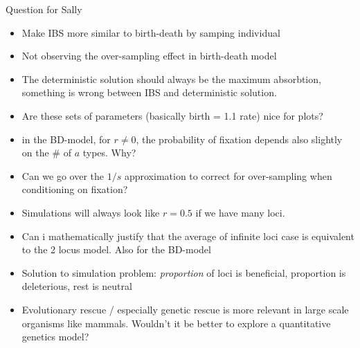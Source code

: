 \documentclass{beamer}
\begin{document}
\begin{frame}{Question for Sally}
\begin{itemize}
    \item Make IBS more similar to birth-death by samping individual 
    \item Not observing the over-sampling effect in birth-death model
    \item The deterministic solution should always be the maximum absorbtion, something is wrong between IBS and deterministic solution. 
    \item Are these sets of parameters (basically birth = 1.1 rate) nice for plots?
    \item in the BD-model, for $r\neq 0$, the probability of fixation depends also slightly on the \# of $a$ types. Why?
    \item Can we go over the $1/s$ approximation to correct for over-sampling when conditioning on fixation?
    \item Simulations will always look like $r=0.5$ if we have many loci.
    \item Can i mathematically justify that the average of infinite loci case is equivalent to the 2 locus model. Also for the BD-model
    \item Solution to simulation problem: \textit{proportion} of loci is beneficial, proportion is deleterious, rest is neutral
    \item Evolutionary rescue / especially genetic rescue is more relevant in large scale organisms like mammals. Wouldn't it be better to explore a quantitative genetics model?
\end{itemize}
    
\end{frame}
\end{document}
